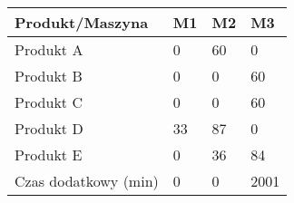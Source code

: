 \documentclass[a4paper,11pt]{report}
\begin{document}
\begin{table}[h!]
\begin{center}
    \begin{tabular}{|l|l|l|l|}\hline
    Produkt/Maszyna& M1 & M2 & M3 \\\hline\hline
    Produkt A      & 0  & 60  & 0  \\\hline
    Produkt B      & 0  & 0  & 60  \\\hline
    Produkt C      & 0  & 0  & 60  \\\hline
    Produkt D      & 33  & 87  & 0  \\\hline
    Produkt E      & 0  & 36  & 84  \\\hline\hline
    Czas dodatkowy (min) & 0  & 0  & 2001  \\\hline
    \end{tabular}
\end{center}
\end{table}
\end{document}
